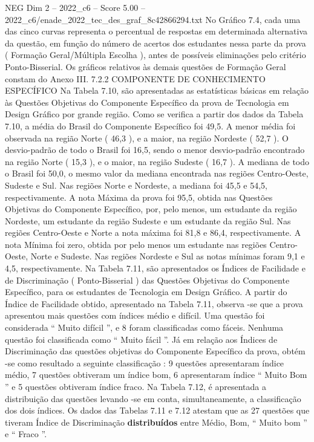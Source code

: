 \begin{textsample}{NEG Dim 2 – 2022\_c6 – Score 5.00 – 2022\_c6/enade\_2022\_tec\_des\_graf\_8c42866294.txt}
No Gráfico 7.4, cada uma das cinco curvas representa o percentual de respostas em determinada alternativa da questão, em função do número de acertos dos estudantes nessa parte da prova ( Formação Geral/Múltipla Escolha ), antes de possíveis eliminações pelo critério Ponto-Bisserial.
Os gráficos relativos às demais questões de Formação Geral constam do Anexo III. 7.2.2 COMPONENTE DE CONHECIMENTO ESPECÍFICO Na Tabela 7.10, são apresentadas as estatísticas básicas em relação às Questões Objetivas do Componente Específico da prova de Tecnologia em Design Gráfico por grande região.
Como se verifica a partir dos dados da Tabela 7.10, a média do Brasil do Componente Específico foi 49,5.
A menor média foi observada na região Norte ( 46,3 ), e a maior, na região Nordeste ( 52,7 ).
O desvio-padrão de todo o Brasil foi 16,5, sendo o menor desvio-padrão encontrado na região Norte ( 15,3 ), e o maior, na região Sudeste ( 16,7 ).
A mediana de todo o Brasil foi 50,0, o mesmo valor da mediana encontrada nas regiões Centro-Oeste, Sudeste e Sul.
Nas regiões Norte e Nordeste, a mediana foi 45,5 e 54,5, respectivamente.
A nota Máxima da prova foi 95,5, obtida nas Questões Objetivas do Componente Específico, por, pelo menos, um estudante da região Nordeste, um estudante da região Sudeste e um estudante da região Sul.
Nas regiões Centro-Oeste e Norte a nota máxima foi 81,8 e 86,4, respectivamente.
A nota Mínima foi zero, obtida por pelo menos um estudante nas regiões Centro-Oeste, Norte e Sudeste.
Nas regiões Nordeste e Sul as notas mínimas foram 9,1 e 4,5, respectivamente.
Na Tabela 7.11, são apresentados os Índices de Facilidade e de Discriminação ( Ponto-Bisserial ) das Questões Objetivas do Componente Específico, para os estudantes de Tecnologia em Design Gráfico.
A partir do Índice de Facilidade obtido, apresentado na Tabela 7.11, observa -se que a prova apresentou mais questões com índices médio e difícil.
Uma questão foi considerada “ Muito difícil ”, e 8 foram classificadas como fáceis.
Nenhuma questão foi classificada como “ Muito fácil ”.
Já em relação aos Índices de Discriminação das questões objetivas do Componente Específico da prova, obtém -se como resultado a seguinte classificação : 9 questões apresentaram índice médio, 7 questões obtiveram um índice bom, 6 apresentaram índice “ Muito Bom ” e 5 questões obtiveram índice fraco.
Na Tabela 7.12, é apresentada a distribuição das questões levando -se em conta, simultaneamente, a classificação dos dois índices.
Os dados das Tabelas 7.11 e 7.12 atestam que as 27 questões que tiveram Índice de Discriminação \textbf{distribuídos} entre Médio, Bom, “ Muito bom ” e “ Fraco ”.

\end{textsample}
